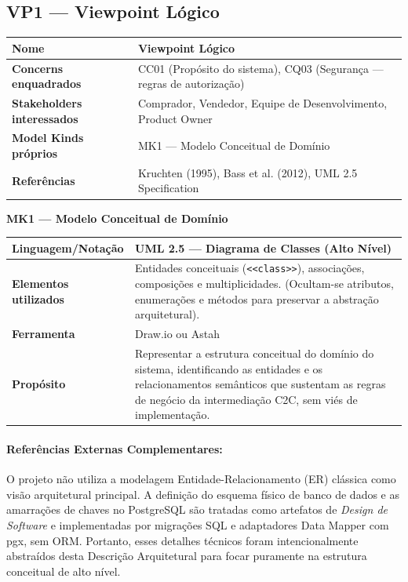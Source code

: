 \documentclass[12pt, a4paper]{article}
\begin{document}
\subsection{VP1 --- Viewpoint Lógico}

\begin{longtable}{|p{4.5cm}|p{10cm}|}
\hline
\textbf{Nome} & Viewpoint Lógico \\
\hline
\textbf{Concerns enquadrados} & CC01 (Propósito do sistema), CQ03 (Segurança --- regras de autorização) \\
\hline
\textbf{Stakeholders interessados} & Comprador, Vendedor, Equipe de Desenvolvimento, Product Owner \\
\hline
\textbf{Model Kinds próprios} & MK1 --- Modelo Conceitual de Domínio \\
\hline
\textbf{Referências} & Kruchten (1995), Bass et al. (2012), UML 2.5 Specification \\
\hline
\end{longtable}

\noindent\textbf{MK1 --- Modelo Conceitual de Domínio}
\begin{longtable}{|p{4.5cm}|p{10cm}|}
\hline
\textbf{Linguagem/Notação} & UML 2.5 --- Diagrama de Classes (Alto Nível) \\
\hline
\textbf{Elementos utilizados} & Entidades conceituais (\texttt{<<class>>}), associações, composições e multiplicidades. (Ocultam-se atributos, enumerações e métodos para preservar a abstração arquitetural). \\
\hline
\textbf{Ferramenta} & Draw.io ou Astah \\
\hline
\textbf{Propósito} & Representar a estrutura conceitual do domínio do sistema, identificando as entidades e os relacionamentos semânticos que sustentam as regras de negócio da intermediação C2C, sem viés de implementação. \\
\hline
\end{longtable}

\paragraph{Referências Externas Complementares:} O projeto não utiliza a modelagem Entidade-Relacionamento (ER) clássica como visão arquitetural principal. A definição do esquema físico de banco de dados e as amarrações de chaves no PostgreSQL são tratadas como artefatos de \textit{Design de Software} e implementadas por migrações SQL e adaptadores Data Mapper com pgx, sem ORM. Portanto, esses detalhes técnicos foram intencionalmente abstraídos desta Descrição Arquitetural para focar puramente na estrutura conceitual de alto nível.
\end{document}
